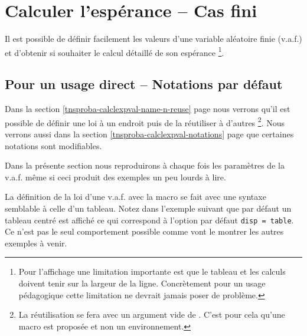 \documentclass[12pt,a4paper]{article}
\begin{document}
\section{Calculer l'espérance -- Cas fini}

Il est possible de définir facilement les valeurs d'une variable aléatoire finie (v.a.f.) et d'obtenir si souhaiter le calcul détaillé de son espérance
\footnote{
    Pour l'affichage une limitation importante est que le tableau et les calculs doivent tenir sur la largeur de la ligne.
    Concrètement pour un usage pédagogique cette limitation ne devrait jamais poser de problème.
}.




\subsection{Pour un usage direct -- Notations par défaut}

Dans la section \ref{tnsproba-calclexpval-name-n-reuse} page \pageref{tnsproba-calclexpval-name-n-reuse} nous verrons qu'il est possible de définir une loi à un endroit puis de la réutiliser à d'autres
\footnote{
    La réutilisation se fera avec un argument vide de . C'est pour cela qu'une macro est proposée et non un environnement.
}.
Nous verrons aussi dans la section \ref{tnsproba-calclexpval-notations} page \pageref{tnsproba-calclexpval-notations} que certaines notations sont modifiables.

\medskip

Dans la présente section nous reproduirons à chaque fois les paramètres de la v.a.f. même si ceci produit des exemples un peu lourds à lire.





La définition de la loi d'une v.a.f. avec la macro  se fait avec une syntaxe semblable à celle d'un tableau.
Notez dans l'exemple suivant que par défaut un tableau centré est affiché ce qui correspond à l'option par  défaut \verb#disp = table#.
Ce n'est pas le seul comportement possible comme vont le montrer les autres exemples à venir.

\begin{latexex-flat}
\end{latexex-flat}
\end{document}
